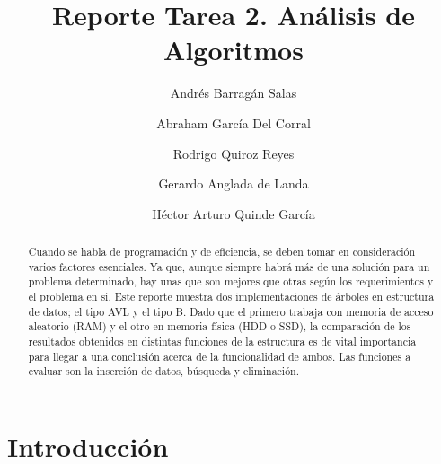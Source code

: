 \documentclass[acmsmall]{acmart}
\begin{document}
\title{Reporte Tarea 2. Análisis de Algoritmos }

\author{Andrés Barragán Salas}


\author{Abraham García Del Corral}

\author{Rodrigo Quiroz Reyes }


\author{Gerardo Anglada de Landa}


\author{Héctor Arturo Quinde García}

\begin{abstract}
 Cuando se habla de programación y de eficiencia, se deben tomar en consideración varios factores esenciales. Ya que, aunque siempre habrá más de una solución para un problema determinado, hay unas que son mejores que otras según los requerimientos y el problema en sí. Este reporte muestra dos implementaciones de árboles en estructura de datos; el tipo AVL y el tipo B. Dado que el primero trabaja con memoria de acceso aleatorio (RAM) y el otro en memoria física (HDD o SSD), la comparación de los resultados obtenidos en distintas funciones de la estructura es de vital importancia para llegar a una conclusión acerca de la funcionalidad de ambos. Las funciones a evaluar son la inserción de datos, búsqueda y eliminación.
\end{abstract}
\renewcommand\footnotetextcopyrightpermission[1]{}

\renewcommand{\shortauthors}{Equipo 2.}

\maketitle

\fancyfoot[L]{}
\thispagestyle{empty}


\section{Introducción}
\end{document}
